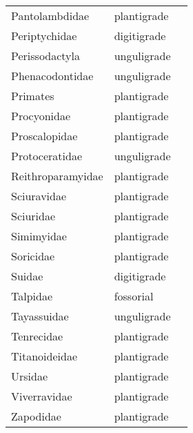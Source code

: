\begin{center}
\begin{longtable}{ l l l }
    Pantolambdidae & plantigrade \\ 
    Periptychidae & digitigrade \\ 
    Perissodactyla & unguligrade \\ 
    Phenacodontidae & unguligrade \\ 
    Primates & plantigrade \\ 
    Procyonidae & plantigrade \\ 
    Proscalopidae & plantigrade \\ 
    Protoceratidae & unguligrade \\ 
    Reithroparamyidae & plantigrade \\ 
    Sciuravidae & plantigrade \\ 
    Sciuridae & plantigrade \\ 
    Simimyidae & plantigrade \\ 
    Soricidae & plantigrade \\ 
    Suidae & digitigrade \\ 
    Talpidae & fossorial \\ 
    Tayassuidae & unguligrade \\ 
    Tenrecidae & plantigrade \\ 
    Titanoideidae & plantigrade \\ 
    Ursidae & plantigrade \\ 
    Viverravidae & plantigrade \\ 
    Zapodidae & plantigrade \\ 
    \hline
    \end{longtable}
\end{center}
